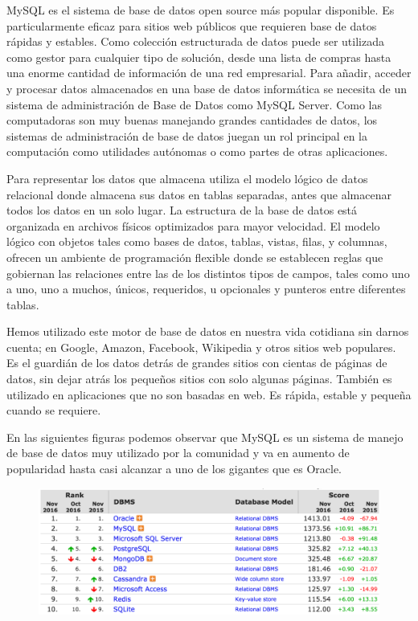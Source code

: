 MySQL es el sistema de base de datos open source más popular disponible. Es particularmente eficaz para sitios web públicos que requieren base de datos rápidas y estables\citep{dyer2015learning}. Como colección estructurada de datos puede ser utilizada como gestor para cualquier tipo de solución, desde una lista de compras hasta una enorme cantidad de información de una red empresarial. Para añadir, acceder y procesar datos almacenados en una base de datos informática se necesita de un sistema de administración de Base de Datos como MySQL Server. Como las computadoras son muy buenas manejando grandes cantidades de datos, los sistemas de administración de base de datos juegan un rol principal en la computación como utilidades autónomas o como partes de otras aplicaciones.

Para representar los datos que almacena utiliza el modelo lógico de datos relacional donde almacena sus datos en tablas separadas, antes que almacenar todos los datos en un solo lugar. La estructura de la base de datos está organizada en archivos físicos optimizados para mayor velocidad. El modelo lógico con objetos tales como bases de datos, tablas, vistas, filas, y columnas, ofrecen un ambiente de programación flexible donde se establecen reglas que gobiernan las relaciones entre las de los distintos tipos de campos, tales como uno a uno, uno a muchos, únicos, requeridos, u opcionales y punteros entre diferentes tablas.

Hemos utilizado este motor de base de datos en nuestra vida cotidiana sin darnos cuenta; en Google, Amazon, Facebook, Wikipedia y otros sitios web populares. Es el guardián de los datos detrás de grandes sitios con cientas de páginas de datos, sin dejar atrás los pequeños sitios con solo algunas páginas. También es utilizado en aplicaciones que no son basadas en web. Es rápida, estable y pequeña cuando se requiere.

En las siguientes figuras podemos observar que MySQL es un sistema de manejo de base de datos muy utilizado por la comunidad y va en aumento de popularidad hasta casi alcanzar a uno de los gigantes que es Oracle.

\begin{figure}[H]
\centering
\includegraphics[width=125mm,scale=1]{Figuras/tecnologias/rank_db_1}
  \label{graph_db_1}
\end{figure}

